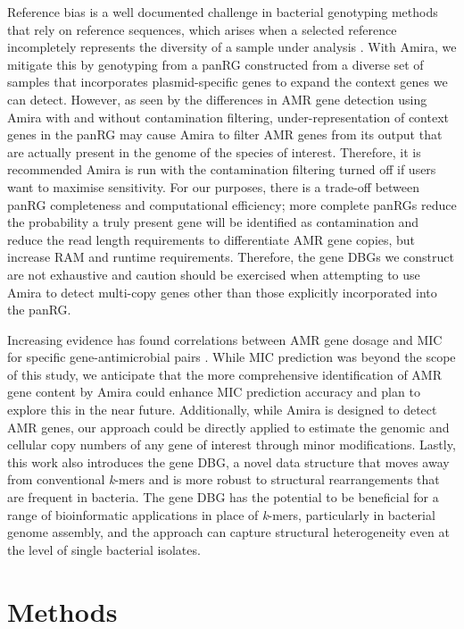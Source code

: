 Reference bias is a well documented challenge in bacterial genotyping methods that rely on reference sequences, which arises when a selected reference incompletely represents the diversity of a sample under analysis  \cite{pandora, 10.1016/s2666-52472100149-x, panaroo}. With Amira, we mitigate this by genotyping from a panRG constructed from a diverse set of samples that incorporates plasmid-specific genes to expand the context genes we can detect. However, as seen by the differences in AMR gene detection using Amira with and without contamination filtering, under-representation of context genes in the panRG may cause Amira to filter AMR genes from its output that are actually present in the genome of the species of interest. Therefore, it is recommended Amira is run with the contamination filtering turned off if users want to maximise sensitivity. For our purposes, there is a trade-off between panRG completeness and computational efficiency; more complete panRGs reduce the probability a truly present gene will be identified as contamination and reduce the read length requirements to differentiate AMR gene copies, but increase RAM and runtime requirements. Therefore, the gene DBGs we construct are not exhaustive and caution should be exercised when attempting to use Amira to detect multi-copy genes other than those explicitly incorporated into the panRG. 

Increasing evidence has found correlations between AMR gene dosage and MIC for specific gene-antimicrobial pairs \cite{10.1128/aac.02026-19, 10.1128/AAC.46.10.3334-3336.2002}. While MIC prediction was beyond the scope of this study, we anticipate that the more comprehensive identification of AMR gene content by Amira could enhance MIC prediction accuracy and plan to explore this in the near future. Additionally, while Amira is designed to detect AMR genes, our approach could be directly applied to estimate the genomic and cellular copy numbers of any gene of interest through minor modifications. Lastly, this work also introduces the gene DBG, a novel data structure that moves away from conventional \textit{k}-mers and is more robust to structural rearrangements that are frequent in bacteria. The gene DBG has the potential to be beneficial for a range of bioinformatic applications in place of \textit{k}-mers, particularly in bacterial genome assembly, and the approach can capture structural heterogeneity even at the level of single bacterial isolates. 

\section*{Methods}

